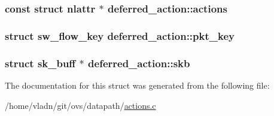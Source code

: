 \subsubsection[{actions}]{\setlength{\rightskip}{0pt plus 5cm}const struct nlattr $\ast$ deferred\+\_\+action\+::actions}\label{structdeferred__action_a9cb4d3dde378a66035e7b17f017d9f89}
\hypertarget{structdeferred__action_a4685f782001923a8f8c20510126b4c21}{}
\subsubsection[{pkt\+\_\+key}]{\setlength{\rightskip}{0pt plus 5cm}struct {\bf sw\+\_\+flow\+\_\+key} deferred\+\_\+action\+::pkt\+\_\+key}\label{structdeferred__action_a4685f782001923a8f8c20510126b4c21}
\hypertarget{structdeferred__action_acba4fd12fba3d60b6f4c7f2f3159f316}{}
\subsubsection[{skb}]{\setlength{\rightskip}{0pt plus 5cm}struct sk\+\_\+buff $\ast$ deferred\+\_\+action\+::skb}\label{structdeferred__action_acba4fd12fba3d60b6f4c7f2f3159f316}


The documentation for this struct was generated from the following file\+:\begin{DoxyCompactItemize}
\item 
/home/vladn/git/ovs/datapath/\hyperlink{actions_8c}{actions.\+c}\end{DoxyCompactItemize}
